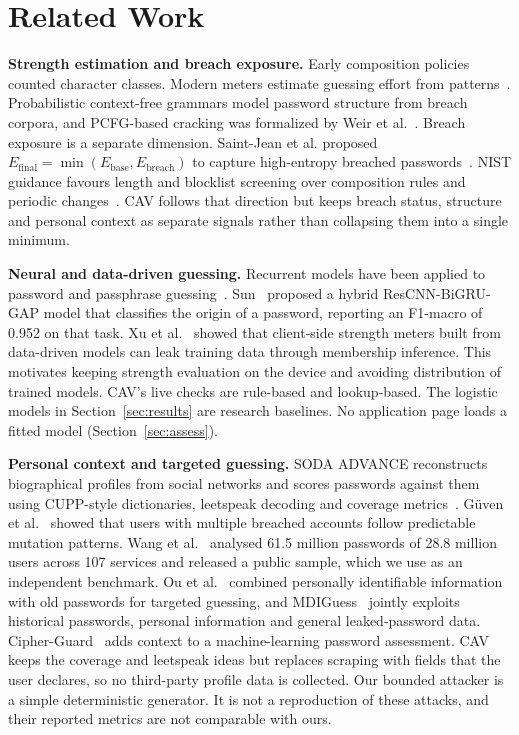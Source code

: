 \documentclass[preprint,12pt]{elsarticle}
\begin{document}
\section{Related Work}
\textbf{Strength estimation and breach exposure.} Early composition policies counted character classes. Modern meters estimate guessing effort from patterns~\cite{wheeler}. Probabilistic context-free grammars model password structure from breach corpora, and PCFG-based cracking was formalized by Weir et al.~\cite{weir}. Breach exposure is a separate dimension. Saint-Jean et al. proposed $E_{\text{final}}=\min(E_{\text{base}},E_{\text{breach}})$ to capture high-entropy breached passwords~\cite{saintjean}. NIST guidance favours length and blocklist screening over composition rules and periodic changes~\cite{nist63b4}. CAV follows that direction but keeps breach status, structure and personal context as separate signals rather than collapsing them into a single minimum.

\textbf{Neural and data-driven guessing.} Recurrent models have been applied to password and passphrase guessing~\cite{nosenko}. Sun~\cite{sun} proposed a hybrid ResCNN-BiGRU-GAP model that classifies the origin of a password, reporting an F1-macro of 0.952 on that task. Xu et al.~\cite{xu} showed that client-side strength meters built from data-driven models can leak training data through membership inference. This motivates keeping strength evaluation on the device and avoiding distribution of trained models. CAV's live checks are rule-based and lookup-based. The logistic models in Section~\ref{sec:results} are research baselines. No application page loads a fitted model (Section~\ref{sec:assess}).

\textbf{Personal context and targeted guessing.} SODA ADVANCE reconstructs biographical profiles from social networks and scores passwords against them using CUPP-style dictionaries, leetspeak decoding and coverage metrics~\cite{atzori2024,atzori2025}. G\"uven et al.~\cite{guven} showed that users with multiple breached accounts follow predictable mutation patterns. Wang et al.~\cite{pass} analysed 61.5 million passwords of 28.8 million users across 107 services and released a public sample, which we use as an independent benchmark. Ou et al.~\cite{ou2026} combined personally identifiable information with old passwords for targeted guessing, and MDIGuess~\cite{mdiguess} jointly exploits historical passwords, personal information and general leaked-password data. Cipher-Guard~\cite{alatawi} adds context to a machine-learning password assessment. CAV keeps the coverage and leetspeak ideas but replaces scraping with fields that the user declares, so no third-party profile data is collected. Our bounded attacker is a simple deterministic generator. It is not a reproduction of these attacks, and their reported metrics are not comparable with ours.
\end{document}
